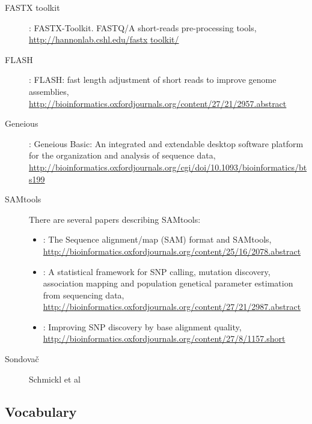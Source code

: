 \documentclass[a4paper, 11pt, twoside]{article}
\begin{document}
\begin{description}
\begin{itemize}
   \end{itemize}
 \item[FASTX toolkit] \citet{Gordon2010}: FASTX-Toolkit. FASTQ/A short-reads pre-processing tools, \href{http://hannonlab.cshl.edu/fastx_toolkit/}{http://hannonlab.cshl.edu/fastx$\_$toolkit/}
 \item[FLASH] \citet{Magoc2011}: FLASH: fast length adjustment of short reads to improve genome assemblies, \href{http://bioinformatics.oxfordjournals.org/content/27/21/2957.abstract}{http://bioinformatics.oxfordjournals.org/content/27/21/2957.abstract}
 \item[Geneious] \citet{Meintjes2012}: Geneious Basic: An integrated and extendable desktop software platform for the organization and analysis of sequence data, \href{http://bioinformatics.oxfordjournals.org/cgi/doi/10.1093/bioinformatics/bts199}{http://bioinformatics.oxfordjournals.org/cgi/doi/10.1093/bioinformatics/bts199}
 \item[SAMtools] There are several papers describing SAMtools:
  \begin{itemize}
   \item \citet{Li2009}: The Sequence alignment/map (SAM) format and SAMtools, \href{http://bioinformatics.oxfordjournals.org/content/25/16/2078.abstract}{http://bioinformatics.oxfordjournals.org/content/25/16/2078.abstract}
   \item \citet{Li2011}: A statistical framework for SNP calling, mutation discovery, association mapping and population genetical parameter estimation from sequencing data, \href{http://bioinformatics.oxfordjournals.org/content/27/21/2987.abstract}{http://bioinformatics.oxfordjournals.org/content/27/21/2987.abstract}
   \item \citet{Li2011a}: Improving SNP discovery by base alignment quality, \href{http://bioinformatics.oxfordjournals.org/content/27/8/1157.short}{http://bioinformatics.oxfordjournals.org/content/27/8/1157.short}
  \end{itemize}
 \item[Sondovač] Schmickl et al
\end{description}

\subsection{Vocabulary}
\end{document}

